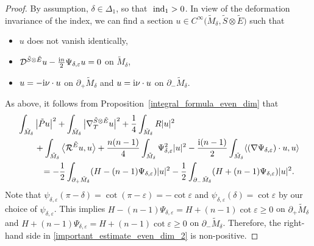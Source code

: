 \documentclass[pdftex]{sigma}
\numberwithin{equation}{section}
\begin{document}
\begin{proof}
By assumption, $\delta \in \Delta_1$, so that $\text{ \rm ind}_1 > 0$. In view of the deformation invariance of the index, we can find a section $u \in C^\infty\big(\tilde{M}_\delta,\tilde{S} \otimes \tilde{E}\big)$ such that
\begin{itemize}\itemsep=0pt
\item $u$ does not vanish identically,
\item $\mathcal{D}^{\tilde{S} \otimes \tilde{E}} u - \frac{{\rm i}n}{2} \Psi_{\delta,\varepsilon} u = 0$ on $\tilde{M}_\delta$,
\item $u = -{\rm i} \nu \cdot u$ on $\partial_+ \tilde{M}_\delta$ and $u = {\rm i} \nu \cdot u$ on $\partial_- \tilde{M}_\delta$.
\end{itemize}
As above, it follows from Proposition~\ref{integral_formula_even_dim} that
\begin{align}
&\int_{\tilde{M}_\delta} \big|\tilde{P} u\big|^2 + \int_{\tilde{M}_\delta} \big|\nabla_T^{\tilde{S} \otimes \tilde{E}} u\big|^2 + \frac{1}{4} \int_{\tilde{M}_\delta} R |u|^2 \nonumber\\
&\qquad+ \int_{\tilde{M}_\delta} \big\langle \mathcal{R}^{\tilde{E}} u,u \big\rangle + \frac{n(n-1)}{4} \int_{\tilde{M}_\delta} \Psi_{\delta,\varepsilon}^2 |u|^2 - \frac{{\rm i}(n-1)}{2} \int_{\tilde{M}_\delta} \langle (\nabla \Psi_{\delta,\varepsilon}) \cdot u,u \rangle\nonumber \\
&\phantom{\qquad+}{}=
-\frac{1}{2} \int_{\partial_+ \tilde{M}_\delta} (H-(n-1)\Psi_{\delta,\varepsilon}) |u|^2 - \frac{1}{2} \int_{\partial_- \tilde{M}_\delta} (H+(n-1)\Psi_{\delta,\varepsilon}) |u|^2. \label{important_estimate_even_dim_2}
\end{align}
Note that $\psi_{\delta,\varepsilon}(\pi-\delta) = \cot(\pi-\varepsilon) = -\cot \varepsilon$ and $\psi_{\delta,\varepsilon}(\delta) = \cot \varepsilon$ by our choice of $\psi_{\delta,\varepsilon}$. This implies $H-(n-1)\Psi_{\delta,\varepsilon} = H+(n-1) \cot \varepsilon \geq 0$ on $\partial_+ \tilde{M}_\delta$ and $H+(n-1)\Psi_{\delta,\varepsilon} = H+(n-1) \cot \varepsilon \geq 0$ on $\partial_- \tilde{M}_\delta$. Therefore, the right-hand side in \eqref{important_estimate_even_dim_2} is non-positive.


\end{proof}
\end{document}
